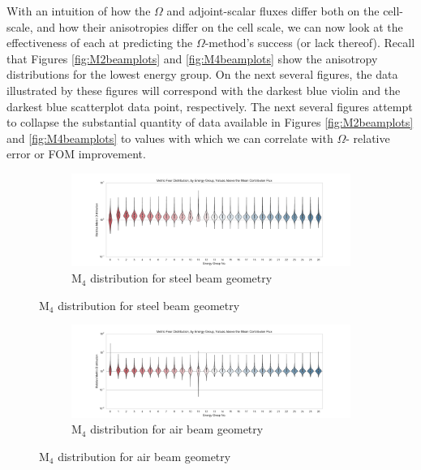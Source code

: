 With an intuition of how the $\Omega$ and adjoint-scalar fluxes differ both on
the cell-scale, and how their anisotropies differ on the cell scale, we can
now look at the effectiveness of each at predicting the $\Omega$-method's
success (or lack thereof). Recall that Figures \ref{fig:M2beamplots} and
\ref{fig:M4beamplots} show the anisotropy distributions for the lowest energy
group. On the next several figures, the data illustrated by these figures will
correspond with the
darkest blue violin and the darkest blue scatterplot data point, respectively.
The next several figures attempt to collapse the substantial quantity of data
available in Figures \ref{fig:M2beamplots} and \ref{fig:M4beamplots} to
values with which we can correlate with $\Omega$- relative error or FOM
improvement.

\begin{figure}[htb!]
  \centering
  \begin{subfigure}[t]{\textwidth}
    \includegraphics[width=\linewidth]{./chapters/characterization_probs/figures/char/prob_1/metric_four_violin_mean.pdf}
    \caption{M$_4$ distribution for steel beam geometry}
    \label{fig:beamsteelviolins}
  \end{subfigure}
\end{figure}
\begin{figure}[htb!]\ContinuedFloat
  \centering
  \begin{subfigure}[t]{\textwidth}
    \includegraphics[width=\linewidth]{./chapters/characterization_probs/figures/char/prob1v1/metric_four_violin_mean.pdf}
    \caption{M$_4$ distribution for air beam geometry}
    \label{fig:beamairviolins}
  \end{subfigure}
\end{figure}
